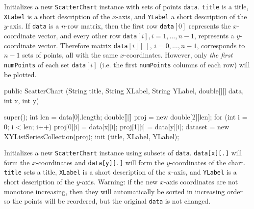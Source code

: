 \begin{tabb}
Initializes a new \texttt{ScatterChart} instance with sets of points \texttt{data}.
\texttt{title} is a title, \texttt{XLabel} is a short description of the
$x$-axis, and \texttt{YLabel} a short description of the $y$-axis.
 If \texttt{data} is a $n$-row matrix,
 then the first row \texttt{data}$[0]$ represents the
 $x$-coordinate vector, and every other row \texttt{data}$[i],
   i=1,\ldots, n-1$, represents a $y$-coordinate vector.
  Therefore matrix \texttt{data}$[i][\ ]$, $i=0,\ldots, n-1$,  corresponds
   to $n-1$ sets of points, all with the same $x$-coordinates.
  However, only \emph{the first} \texttt{numPoints} of each set \texttt{data}$[i]$
  (i.e. the first \texttt{numPoints} columns of each row)
  will be plotted.
\end{tabb}
\begin{htmlonly}
\end{htmlonly}
\begin{code}

   public ScatterChart (String title, String XLabel, String YLabel,
                        double[][] data, int x, int y) \begin{hide} {
      super();
      int len = data[0].length;
      double[][] proj = new double[2][len];
      for (int i = 0; i < len; i++) {
         proj[0][i] = data[x][i];
         proj[1][i] = data[y][i];
      }
      dataset = new XYListSeriesCollection(proj);
      init (title, XLabel, YLabel);
   }\end{hide}
\end{code}
\begin{tabb}
Initializes a new \texttt{ScatterChart} instance using subsets of \texttt{data}.
\texttt{data[x][.]} will form the $x$-coordinates and
\texttt{data[y][.]} will form the $y$-coordinates of the chart.
\texttt{title} sets a title, \texttt{XLabel} is a short description of the
$x$-axis, and \texttt{YLabel} is a short description of the $y$-axis.
Warning: if the new $x$-axis coordinates are not monotone increasing, then
they will automatically be sorted in increasing order so the points will
be reordered, but the original \texttt{data} is not changed.
\end{tabb}
\begin{htmlonly}
\end{htmlonly}
